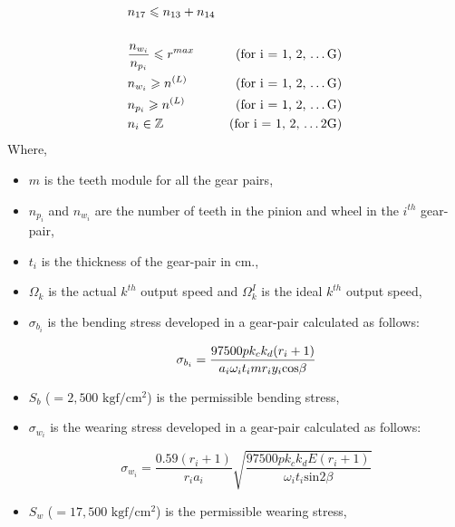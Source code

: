 \begin{singlespacing}
\begin{flushleft}
{\begin{align}
    \nonumber\\
    &n_{17} \leqslant n_{13} + n_{14}\\
    \nonumber\\
    &\frac{n_{w_i}} {n_{p_i}}  \leqslant r^{max} \quad &\left. \text{(for i = 1, 2, \dots G)} \right.\nonumber\\
    &n_{w_i} \geqslant n^{(L)} &\left. \text{(for i = 1, 2, \dots G)} \right.\nonumber\\
    &n_{p_i} \geqslant n^{(L)} &\left. \text{(for i = 1, 2, \dots G)} \right.\nonumber\\
    &n_i \in \mathbb{Z} &\left. \text{(for i = 1, 2, \dots 2G)} \right. 
  \end{align}
}
Where, 

\end{flushleft}

\begin{itemize}
\item $m$ is the teeth module for all the gear pairs,
\item $n_{p_i}$ and $n_{w_i}$ are the number of teeth in the pinion 
and wheel in the $i^{th}$ gear-pair,
\item $t_i$ is the thickness of the gear-pair in cm., 
\item $\Omega_k$ is the actual $k^{th}$ output speed and $\Omega_k^I$ is the ideal $k^{th}$ output speed,
\item ${\sigma}_{b_i}$ is the bending stress developed in a gear-pair 
calculated as follows:

\begin{equation}
\sigma_{b_{i}} = \frac{97500 p { } k_c { } k_d { } (r_i + 1)} {a_{ i} { } {\omega}_{ i} { } t_{ i} { } m { } r_{ i} { } y_{ i} { } \text{cos} \beta} \\
\end{equation}

\item $S_b$ ($= 2,500\text{ kgf}/\text{cm}^2$) is the permissible bending stress,

\item ${\sigma}_{w_i}$ is the wearing stress developed in a gear-pair
calculated as follows:

\begin{equation}
\sigma_{w_{i}} = \frac{0.59 (r_i+1)}{r_i a_i} \sqrt{\frac{97500 p { } k_c { } k_d { } E (r_i + 1)}{ {\omega}_i t_i \text{sin} 2 \beta}}
\end{equation}
\item $S_w$ ($= 17,500\text{ kgf}/\text{cm}^2$) is the permissible wearing stress,


\end{itemize}
\end{singlespacing}
